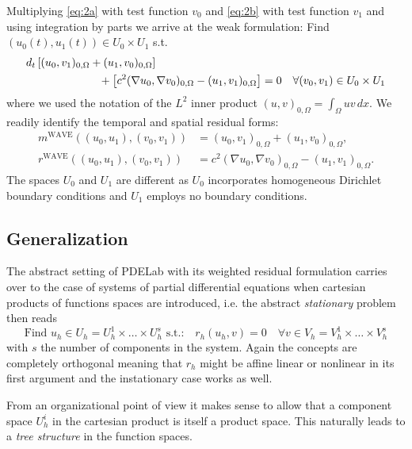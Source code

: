 \documentclass[a4paper,12pt]{article}
\begin{document}
Multiplying \eqref{eq:2a}
with test function $v_0$ and \eqref{eq:2b} with test function $v_1$
and using integration by parts we arrive at the weak formulation: Find $(u_0(t),u_1(t))\in
U_0\times U_1$ s.t.
\begin{equation}
\label{eq:WeakForm}
\begin{split}
d_t &\left[ (u_0,v_1)_{0,\Omega} + (u_1,v_0)_{0,\Omega}\right] \\
&\hspace{20mm}+ \left[ c^2 (\nabla u_0,\nabla v_0)_{0,\Omega} -(u_1,v_1)_{0,\Omega} \right] = 0 
\quad \forall (v_0,v_1)\in U_0\times U_1
\end{split}
\end{equation}
where we used the notation of the $L^2$ inner product $(u,v)_{0,\Omega} = \int_\Omega
u v \, dx$.
We readily identify the temporal and spatial residual forms:
\begin{align}
m^{\text{WAVE}}((u_0,u_1),(v_0,v_1)) &= (u_0,v_1)_{0,\Omega} + (u_1,v_0)_{0,\Omega},
\label{eq:TemporalResForm}\\
r^{\text{WAVE}}((u_0,u_1),(v_0,v_1)) &= c^2 (\nabla u_0,\nabla v_0)_{0,\Omega} - (u_1,v_1)_{0,\Omega} . \label{eq:SpatialResForm}
\end{align}
The spaces $U_0$ and $U_1$ are different as $U_0$ incorporates homogeneous 
Dirichlet boundary conditions and $U_1$ employs no boundary conditions.

\subsection*{Generalization}

The abstract setting of PDELab with its weighted residual formulation
carries over to the case of systems of
partial differential equations when cartesian products of
functions spaces are introduced, i.e. the abstract \textit{stationary} problem then reads
\begin{equation}
\text{Find $u_h\in U_h=U_h^1\times \ldots \times U_h^s$ s.t.:} \quad r_h(u_h,v)=0 
\quad \forall v\in V_h=V_h^1\times\ldots\times V_h^s
\label{Eq:BasicSystemBuildingBlock}
\end{equation}
with $s$ the number of components in the system. Again the concepts
are completely orthogonal meaning that $r_h$ might be affine linear or nonlinear
in its first argument and the instationary case works as well.

From an organizational point of view it makes sense to allow that
a component space $U_h^i$ in the cartesian product is itself 
a product space. This naturally leads to a \textit{tree structure} in the
function spaces.
\end{document}
